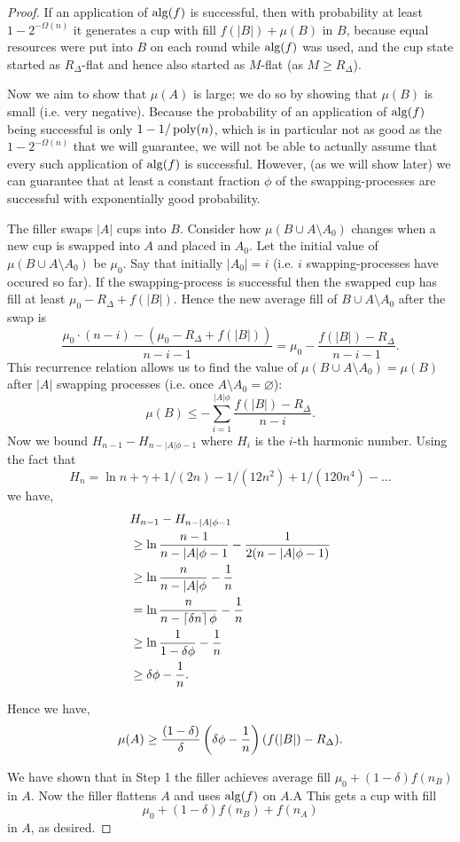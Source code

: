 \begin{proof}
{\color{purple}
  If an application of $\operatorname{\text{\textup{alg}}}(f)$ is successful, then with
  probability at least $1-2^{-\Omega(n)}$ it generates a cup with
  fill $f(|B|) + \mu(B)$ in $B$, because equal resources were put
  into $B$ on each round while $\operatorname{\text{\textup{alg}}}(f)$ was used, and the cup
  state started as $R_\Delta$-flat and
  hence also started as $M$-flat (as $M\ge R_\Delta$).

  Now we aim to show that $\mu(A)$ is large; we do so by showing
  that $\mu(B)$ is small (i.e. very negative). Because the
  probability of an application of $\operatorname{\text{\textup{alg}}}(f)$ being successful is
  only $1-1/\operatorname{\text{poly}}(n)$, which is in particular not as good as the
  $1-2^{-\Omega(n)}$ that we will guarantee, we will not be able
  to actually assume that every such application of $\operatorname{\text{\textup{alg}}}(f)$ is
  successful. However, (as we will show later) we can guarantee
  that at least a constant fraction $\phi$ of the
  swapping-processes are successful with
  exponentially good probability.

  The filler swaps $|A|$ cups into $B$. 
  Consider how $\mu(B \cup A\setminus A_0)$ changes when a new
  cup is swapped into $A$ and placed in $A_0$. Let the initial value
  of $\mu(B \cup A\setminus A_0)$ be $\mu_0$. Say that
  initially $|A_0| = i$ (i.e. $i$ swapping-processes have occured
  so far). If the swapping-process is successful then the swapped cup has
  fill at least $\mu_0 - R_\Delta + f(|B|)$. Hence the new
  average fill of $B \cup A\setminus A_0$ after the swap is
  $$\frac{\mu_0\cdot (n-i) - (\mu_0 - R_\Delta + f(|B|))}{n-i-1} =
  \mu_0 - \frac{f(|B|) - R_\Delta}{n-i-1}.$$
  This recurrence relation allows us to find the value of
  $\mu(B \cup A\setminus A_0) = \mu(B)$ after $|A|$ swapping
  processes (i.e. once $A\setminus A_0 = \varnothing$):
  $$\mu(B) \le -\sum_{i=1}^{|A|\phi} \frac{f(|B|)-R_\Delta}{n-i}.$$
  Now we bound $H_{n-1} - H_{n-|A|\phi-1}$ where $H_i$ is the $i$-th harmonic number.
  Using the fact that 
  $$H_n = \ln n + \gamma + 1/(2n) - 1/(12 n^2) + 1/(120 n^4) - \ldots$$
  we have,
  \begin{align*}
    &H_{n-1} - H_{n-|A|\phi-1}\\
  &\ge \ln \frac{n-1}{n-|A|\phi-1} - \frac{1}{2(n-|A|\phi-1)}\\
  &\ge \ln \frac{n}{n-|A|\phi} - \frac{1}{n}\\
  &= \ln \frac{n}{n-\left\lceil \delta n \right\rceil\phi} - \frac{1}{n}\\
  &\ge \ln \frac{1}{1-\delta\phi} - \frac{1}{n}\\
  &\ge \delta\phi - \frac{1}{n}.
  \end{align*}

  Hence we have, 
  \begin{equation}
    \label{eq:nastyobliviousamplificationlemmastep1backlog}
  \mu(A) \ge
  \frac{(1-\delta)}{\delta}\left( \delta\phi-\frac{1}{n} \right)(f(|B|)-R_\Delta).
  \end{equation}
}

We have shown that in Step 1 the filler achieves average fill
$\mu_0 + (1-\delta)f(n_B)$ in $A$.
Now the filler flattens $A$ and uses $\operatorname{\text{\textup{alg}}}(f)$ on $A$.A
This gets a cup with fill 
$$\mu_0 + (1-\delta)f(n_B) + f(n_A)$$
in $A$, as desired.

\end{proof}

